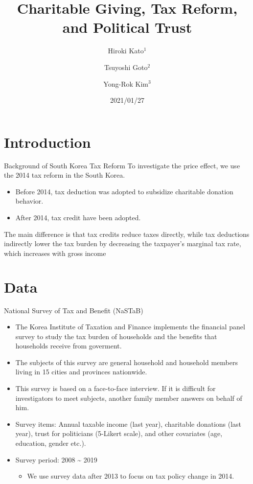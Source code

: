 \documentclass[
  ignorenonframetext,
]{beamer}
\title{Charitable Giving, Tax Reform, and Political Trust}
\author{Hiroki Kato\(^1\) \and Tsuyoshi Goto\(^2\) \and Yong-Rok
Kim\(^3\)}
\date{2021/01/27}
\institute{\(^1\)Osaka University \and \(^2\)Chiba
University \and \(^3\)Kobe University}
\providecommand{\tightlist}{%
  \setlength{\itemsep}{0pt}\setlength{\parskip}{0pt}}
\begin{document}
\frame{\titlepage}

\hypertarget{introduction}{%
\section{Introduction}\label{introduction}}

\begin{frame}{Background of South Korea Tax Reform}
\protect\hypertarget{background-of-south-korea-tax-reform}{}
To investigate the price effect, we use the 2014 tax reform in the South
Korea.

\begin{itemize}
\tightlist
\item
  Before 2014, tax deduction was adopted to subsidize charitable
  donation behavior.
\item
  After 2014, tax credit have been adopted.
\end{itemize}

The main difference is that tax credits reduce taxes directly, while tax
deductions indirectly lower the tax burden by decreasing the taxpayer's
marginal tax rate, which increases with gross income
\end{frame}

\hypertarget{data}{%
\section{Data}\label{data}}

\begin{frame}{National Survey of Tax and Benefit (NaSTaB)}
\protect\hypertarget{national-survey-of-tax-and-benefit-nastab}{}
\begin{itemize}
\tightlist
\item
  The Korea Institute of Taxation and Finance implements the financial
  panel survey to study the tax burden of households and the benefits
  that households receive from goverment.
\item
  The subjects of this survey are general household and household
  members living in 15 cities and provinces nationwide.
\item
  This survey is based on a face-to-face interview. If it is difficult
  for investigators to meet subjects, another family member answers on
  behalf of him.
\item
  Survey items: Annual taxable income (last year), charitable donations
  (last year), trust for politicians (5-Likert scale), and other
  covariates (age, education, gender etc.).
\item
  Survey period: 2008 \textasciitilde{} 2019

  \begin{itemize}
  \tightlist
  \item
    We use survey data after 2013 to focus on tax policy change in 2014.
  \end{itemize}
\end{itemize}
\end{frame}
\end{document}
